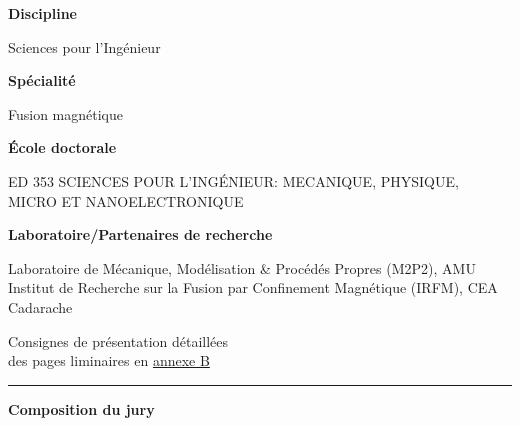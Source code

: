\vspace{4em}

\begin{center}
	\begin{minipage}[t]{.40\linewidth}
    	    \vspace{.5em}
        	\textsf{\textbf{Discipline}}
        	
        	\textsf{Sciences pour l'Ingénieur}
        	
    	    \vspace{1em}
        	\textsf{\textbf{Spécialité}}
        	
        	\textsf{Fusion magnétique}
        	
    	    \vspace{2em}
        	\textsf{\textbf{École doctorale}}
        	
        	\textsf{ED 353 SCIENCES POUR L'INGÉNIEUR: MECANIQUE, PHYSIQUE, MICRO ET NANOELECTRONIQUE}
        	
    	    \vspace{1em}
        	\textsf{\textbf{Laboratoire/Partenaires de recherche}}
        	
        	\textsf{Laboratoire de Mécanique, Modélisation \& Procédés Propres (M2P2), AMU \\
        		Institut de Recherche sur la Fusion par Confinement Magnétique (IRFM), CEA Cadarache
        	}

    	    \vspace{3em}
        	\textsf{Consignes de présentation détaillées\\
			des pages liminaires en \hyperref[chap:consignes]{annexe B}}
	\end{minipage}\hfill
	\begin{minipage}[t]{.03\linewidth}
	    \rule[-280pt]{1pt}{280pt}
	\end{minipage}\hfill
	\begin{minipage}[t]{.52\linewidth}
	    \vspace{.5em}
    	\textsf{\textbf{Composition du jury}}


\end{minipage}
\end{center}
